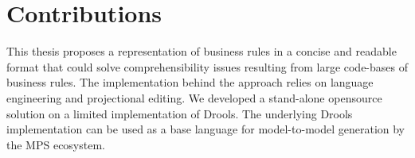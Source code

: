 \section{Contributions}

This thesis proposes a representation of business rules in a concise and readable format that could solve comprehensibility issues resulting from large code-bases of business rules.
The implementation behind the approach relies on language engineering and projectional editing.
We developed a stand-alone opensource solution on a limited implementation of Drools.
The underlying Drools implementation can be used as a base language for model-to-model generation by the MPS ecosystem.